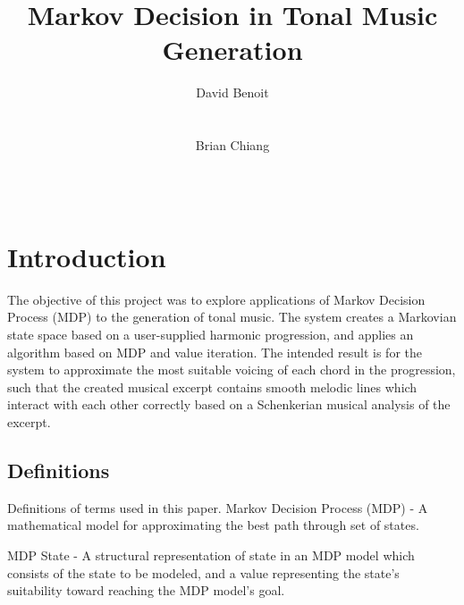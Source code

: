 \documentclass{chi2009}
\begin{document}
\setlength{\paperheight}{11in}
\setlength{\paperwidth}{8.5in}
\setlength{\pdfpageheight}{\paperheight}
\setlength{\pdfpagewidth}{\paperwidth}


\title{Markov Decision in Tonal Music Generation}
\author{
  \alignauthor David Benoit\\
    \\
    \\
  \alignauthor Brian Chiang\\
    \\
    \\
}

\maketitle


\section{Introduction}

	The objective of this project was to explore applications of Markov Decision Process (MDP) to the generation of tonal music.  The system creates a Markovian state space based on a user-supplied harmonic progression, and applies an algorithm based on MDP and value iteration.  The intended result is for the system to approximate the most suitable voicing of each chord in the progression, such that the created musical excerpt contains smooth melodic lines which interact with each other correctly based on a Schenkerian musical analysis of the excerpt.

\subsection{Definitions}
Definitions of terms used in this paper.
Markov Decision Process (MDP) -  A mathematical model for approximating the best path through set of states.

MDP State - A structural representation of state in an MDP model which consists of the state to be modeled, and a value representing the state's suitability toward reaching the MDP model's goal.
\end{document}
